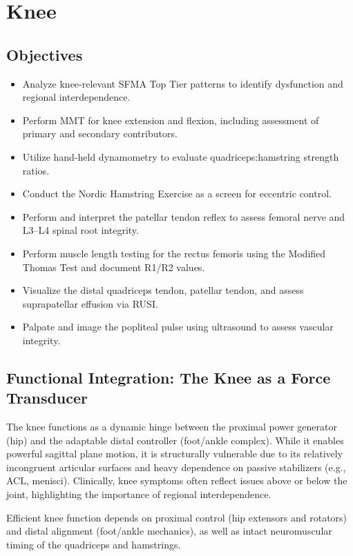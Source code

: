 \chapter{Knee}\label{chp:knee}

\section*{Objectives}

\begin{itemize}
  \item Analyze knee-relevant SFMA Top Tier patterns to identify dysfunction and regional interdependence.
  \item Perform MMT for knee extension and flexion, including assessment of primary and secondary contributors.
  \item Utilize hand-held dynamometry to evaluate quadriceps:hamstring strength ratios.
  \item Conduct the Nordic Hamstring Exercise as a screen for eccentric control.
  \item Perform and interpret the patellar tendon reflex to assess femoral nerve and L3–L4 spinal root integrity.
  \item Perform muscle length testing for the rectus femoris using the Modified Thomas Test and document R1/R2 values.
  \item Visualize the distal quadriceps tendon, patellar tendon, and assess suprapatellar effusion via RUSI.
  \item Palpate and image the popliteal pulse using ultrasound to assess vascular integrity.
\end{itemize}

\section*{Functional Integration: The Knee as a Force Transducer}

The knee functions as a dynamic hinge between the proximal power generator (hip) and the adaptable distal controller (foot/ankle complex). While it enables powerful sagittal plane motion, it is structurally vulnerable due to its relatively incongruent articular surfaces and heavy dependence on passive stabilizers (e.g., ACL, menisci). Clinically, knee symptoms often reflect issues above or below the joint, highlighting the importance of regional interdependence.

Efficient knee function depends on proximal control (hip extensors and rotators) and distal alignment (foot/ankle mechanics), as well as intact neuromuscular timing of the quadriceps and hamstrings.


